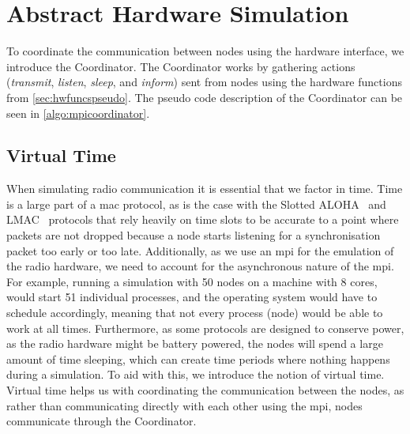 \section{Abstract Hardware Simulation}\label{sec:coordinator}
To coordinate the communication between nodes using the hardware interface, we introduce the Coordinator. The
Coordinator works by gathering actions (\textit{transmit}, \textit{listen}, \textit{sleep}, and
\textit{inform}) sent from nodes using the hardware functions from \autoref{sec:hwfuncspseudo}. The pseudo
code description of the Coordinator can be seen in \autoref{algo:mpicoordinator}. 

\subsection{Virtual Time}\label{sec:virtual-time}
When simulating radio communication it is essential that we factor in time. Time is a large part of a
\gls{mac} protocol, as is the case with the Slotted ALOHA~\cite{Roberts:1975:APS:1024916.1024920} and
LMAC~\cite{paper:lmac_protocol} protocols that rely heavily on time slots to be accurate to a point where
packets are not dropped because a node starts listening for a synchronisation packet too early or too late.
Additionally, as we use an \acrshort{mpi} for the emulation of the radio hardware, we need to account for the
asynchronous nature of the \acrshort{mpi}. For example, running a simulation with 50 nodes on a machine with 8
cores, would start 51 individual processes, and the operating system would have to schedule accordingly,
meaning that not every process (node) would be able to work at all times. Furthermore, as some protocols are
designed to conserve power, as the radio hardware might be battery powered, the nodes will spend a large
amount of time sleeping, which can create time periods where nothing happens during a simulation. To aid with
this, we introduce the notion of virtual time. Virtual time helps us with coordinating the communication
between the nodes, as rather than communicating directly with each other using the \gls{mpi}, nodes
communicate through the Coordinator. \smallbreak

